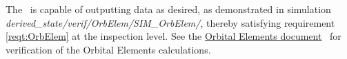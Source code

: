 %
%
% 
%


\label{inspect:OrbElem}
 The \OrbElemDesc\ is capable of outputting data as desired, as demonstrated in simulation \textit{derived\_state/verif/OrbElem/SIM\_OrbElem/}, thereby satisfying
 requirement \ref{reqt:OrbElem} at the inspection level.  See the 
\href{file:\JEODHOME/models/utils/orbital_elements/docs/orbital_elements.pdf}{Orbital Elements document}~\cite{dynenv:ORBITALELEMENTS} for verification of the Orbital Elements calculations.

